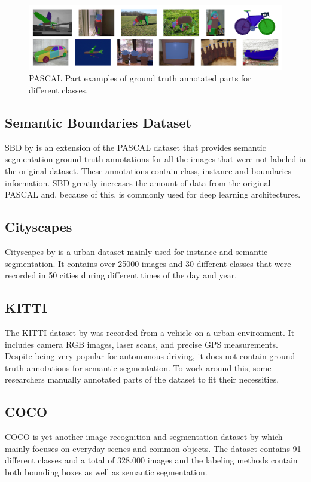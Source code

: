 \begin{figure}[h]
	\includegraphics[scale=0.35]{archivos/pascal_part.png}
	\centering
	\caption{PASCAL Part examples of ground truth annotated parts for different classes.}
	\label{fig:pascal_part}
\end{figure}

\subsection{Semantic Boundaries Dataset}
SBD by \cite{BharathICCV2011} is an extension of the PASCAL dataset that provides semantic segmentation ground-truth annotations for all the images that were not labeled in the original dataset. These annotations contain class, instance and boundaries information. SBD greatly increases the amount of data from the original PASCAL and, because of this, is commonly used for deep learning architectures.

\subsection{Cityscapes}
Cityscapes by \cite{DBLP:journals/corr/CordtsORREBFRS16} is a urban dataset mainly used for instance and semantic segmentation. It contains over 25000 images and 30 different classes that were recorded in 50 cities during different times of the day and year.

\subsection{KITTI}
The KITTI dataset by \cite{Geiger2013IJRR} was recorded from a vehicle on a urban environment. It includes camera RGB images, laser scans, and precise GPS measurements. Despite being very popular for autonomous driving, it does not contain ground-truth annotations for semantic segmentation. To work around this, some researchers manually annotated parts of the dataset to fit their necessities. 

\subsection{COCO}
COCO is yet another image recognition and segmentation dataset by \cite{DBLP:journals/corr/LinMBHPRDZ14} which mainly focuses on everyday scenes and common objects. The dataset contains 91 different classes and a total of 328.000 images and the labeling methods contain both bounding boxes as well as semantic segmentation.